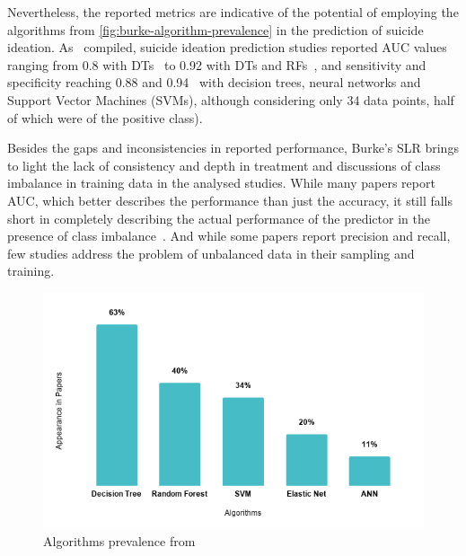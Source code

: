 Nevertheless, the reported metrics are indicative of the potential of employing the algorithms from \autoref{fig:burke-algorithm-prevalence} in the prediction of suicide ideation.
As~\citet{Burke2019} compiled, suicide ideation prediction studies reported AUC values ranging from 0.8 with DTs~\cite{Handley2014} to 0.92 with DTs and RFs~\cite{Gradus2017}, and sensitivity and specificity reaching 0.88 and 0.94~\cite{Just2017} with decision trees, neural networks and Support Vector Machines (SVMs), although considering only 34 data points, half of which were of the positive class).

Besides the gaps and inconsistencies in reported performance, Burke's SLR brings to light the lack of consistency and depth in treatment and discussions of class imbalance in training data in the analysed studies.
While many papers report AUC, which better describes the performance than just the accuracy, it still falls short in completely describing the actual performance of the predictor in the presence of class imbalance~\cite{Burke2019}.
And while some papers report precision and recall, few studies address the problem of unbalanced data in their sampling and training.

\begin{figure}[h]
    \caption{Algorithms prevalence from~\citet{Burke2019}}
    \centerline{\includegraphics[scale=.75]{fig_burke_alg_usage.png}}
    \label{fig:burke-algorithm-prevalence}
\end{figure}

